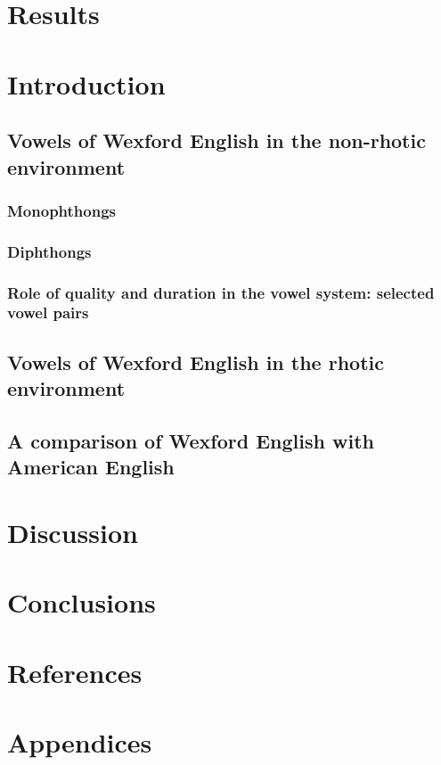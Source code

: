 \documentclass[11pt]{article}
\begin{document}
\section{Results}

\section{Introduction}

\subsection{Vowels of Wexford English in the non-rhotic environment}

\subsubsection{Monophthongs}

\subsubsection{Diphthongs}

\subsubsection{Role of quality and duration in the vowel system: selected vowel pairs}

\subsection{Vowels of Wexford English in the rhotic environment}

\subsection{A comparison of Wexford English with American English}

\section{Discussion}

\section{Conclusions}

\section{References}




\section{Appendices}
\end{document}
